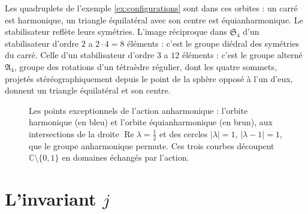 \documentclass[11pt,a4paper]{article}
\theoremstyle{plain}
\theoremstyle{definition}
\theoremstyle{remark}
\newcommand{\C}{\mathbb{C}}
\newcommand{\Sym}{\mathfrak{S}}
\begin{document}
Les quadruplets de l'exemple \ref{ex:configurations} sont dans ces orbites : un carré est harmonique, un triangle équilatéral avec son centre est équianharmonique. Le stabilisateur reflète leurs symétries. L'image réciproque dans $\Sym_4$ d'un stabilisateur d'ordre $2$ a $2\cdot4=8$ éléments : c'est le groupe diédral des symétries du carré. Celle d'un stabilisateur d'ordre $3$ a $12$ éléments : c'est le groupe alterné $\mathfrak A_4$, groupe des rotations d'un tétraèdre régulier, dont les quatre sommets, projetés stéréographiquement depuis le point de la sphère opposé à l'un d'eux, donnent un triangle équilatéral et son centre.

\begin{figure}[h]
\centering
{}
\caption{Les points exceptionnels de l'action anharmonique : l'orbite harmonique (en bleu) et l'orbite équianharmonique (en brun), aux intersections de la droite $\operatorname{Re}\lambda=\frac12$ et des cercles $|\lambda|=1$, $|\lambda-1|=1$, que le groupe anharmonique permute. Ces trois courbes découpent $\C\setminus\{0,1\}$ en domaines échangés par l'action.}\label{fig:orbites}
\end{figure}

\section{L'invariant \texorpdfstring{$j$}{j}}
\end{document}

